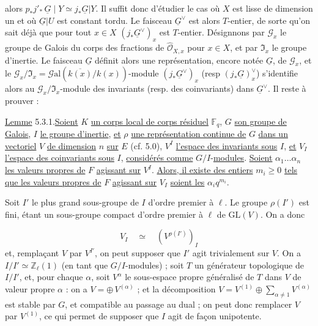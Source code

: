 alors $p_*j'_*\,\underline{G} \mid Y \simeq j_*\underline{G}|Y$. Il suffit donc d'étudier le cas où $X$ est lisse de dimension un et où $\underline{G}|U$ est constant tordu. Le faisceau $\underline{G}^\vee$ est alors $T$-entier, de sorte qu'on sait déjà que pour tout $x \in X$ $(j_* \underline{G}^\vee)_x$
est $T$-entier. Désignnons par $\mathcal{G}_x$ le groupe de Galois du corps des fractions de $\hat{\mathcal{O}}_{X,x}$ pour $x \in X$, et par $\mathfrak{I}_x$ le groupe d'inertie. Le faisceau $\underline{G}$ définit alors une représentation, encore notée $\underline{G}$, de $\mathcal{G}_x$, et le $\mathcal{G}_x/\mathfrak{I}_x = \mathcal{G}\mathrm{al}(\overline{k(x)}/k(x))$-module $(j_*\underline{G}^\vee)_x$ (resp $(j_*\underline{G})_x^\vee$) s'identifie alors au $\mathcal{G}_x/\mathfrak{I}_x$-module des invariants (resp. des coinvariants) dans $\underline{G}^\vee$. Il reste à prouver :

\underline{Lemme} 5.3.1.\quad \underline{Soient} $K$ \underline{un corps local de corps résiduel} $\mathbb{F}_q$, $G$ \underline{son groupe de Galois}, $I$ \underline{le groupe d'inertie}, \underline{et} $\rho$ \underline{une représentation continue de} $G$ \underline{dans un vectoriel} $V$ \underline{de dimension} $n$ \underline{sur} $E$ (cf. 5.0), $V^I$ \underline{l'espace des invariants sous} $I$, \underline{et} $V_I$ \underline{l'espace des coinvariants sous} $I$, \underline{considérés comme} $G/I$-\underline{modules}. \underline{Soient} $\alpha_1 \ldots \alpha_n$ \underline{les valeurs propres de} $F$ \underline{agissant sur} $V^I$. \underline{Alors, il existe des entiers} $m_i \geq 0$ \underline{tels que les valeurs propres de} $F$ \underline{agissant sur} $V_I$ \underline{soient les} $\alpha_i q^{m_i}$.

Soit $I'$ le plus grand sous-groupe de $I$ d'ordre premier à $\ell$. Le groupe $\rho(I')$ est fini, étant un sous-groupe compact d'ordre premier à $\ell$ de $\mathrm{GL}(V)$. On a donc

\begin{equation*}
V_I \quad \simeq \quad (V^{\rho(I')})_I
\end{equation*}
et, remplaçant $V$ par $V^{I'}$, on peut supposer que $I'$ agit trivialement sur $V$. On a $I/I' \simeq \mathbb{Z}_\ell(1)$ (en tant que $G/I$-modules) ; soit $T$ un générateur topologique de $I/I'$, et, pour chaque $\alpha$, soit $V^\alpha$ le sous-espace propre généralisé de $T$ dans $V$ de valeur propre $\alpha$ : on a $V = \oplus\, V^{(\alpha)}$ ; et la décomposition $V = V^{(1)} \oplus \sum_{\alpha \neq 1} V^{(\alpha)}$ est stable par $G$, et compatible
au passage au dual ; on peut donc remplacer $V$ par $V^{(1)}$, ce qui permet de supposer que $I$ agit de façon unipotente.

